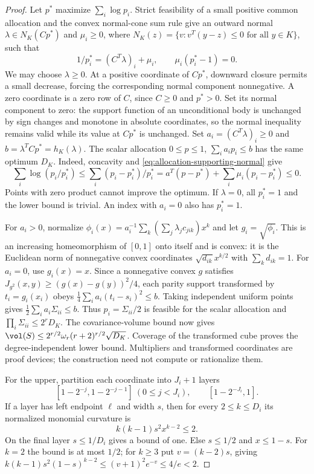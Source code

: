 \begin{proof}
Let $p^*$ maximize $\sum_i\log p_i$. Strict feasibility of a small
positive common allocation and the convex normal-cone sum rule give
an outward normal $\lambda\in N_K(Cp^*)$ and $\mu_i\ge0$, where
$N_K(z)=\{v:v^T(y-z)\le0\text{ for all }y\in K\}$, such that
\begin{equation}\label{eq:allocation-supporting-normal}
 1/p_i^*=(C^T\lambda)_i+\mu_i,\qquad
 \mu_i(p_i^*-1)=0.
\end{equation}
We may choose $\lambda\ge0$. At a positive coordinate of $Cp^*$,
downward closure permits a small decrease, forcing the corresponding
normal component nonnegative. A zero coordinate is a zero row of $C$,
since $C\ge0$ and $p^*>0$. Set its normal component to zero: the
support function of an unconditional body is unchanged by sign changes
and monotone in absolute coordinates, so the normal inequality remains
valid while its value at $Cp^*$ is unchanged.
Set $a_i=(C^T\lambda)_i\ge0$ and
$b=\lambda^TCp^*=h_K(\lambda)$. The scalar allocation
$0\le p\le1$, $\sum_i a_ip_i\le b$ has the same optimum $D_K$.
Indeed, concavity and \eqref{eq:allocation-supporting-normal} give
\[
 \sum_i\log(p_i/p_i^*)
 \le\sum_i(p_i-p_i^*)/p_i^*
 =a^T(p-p^*)+\sum_i\mu_i(p_i-p_i^*)\le0.
\]
Points with zero product cannot improve the optimum. If $\lambda=0$,
all $p_i^*=1$ and the lower bound is trivial. An index with $a_i=0$
also has $p_i^*=1$.

For $a_i>0$, normalize
$\phi_i(x)=a_i^{-1}\sum_k(\sum_j\lambda_jc_{jik})x^k$ and let
$g_i=\sqrt{\phi_i}$. This is an increasing homeomorphism of $[0,1]$
onto itself and is convex: it is the Euclidean norm of nonnegative
convex coordinates $\sqrt{d_{ik}}x^{k/2}$ with $\sum_kd_{ik}=1$.
For $a_i=0$, use $g_i(x)=x$. Since a nonnegative convex $g$ satisfies
$J_{g^2}(x,y)\ge(g(x)-g(y))^2/4$, each parity support transformed
by $t_i=g_i(x_i)$ obeys
$\frac14\sum_i a_i(t_i-s_i)^2\le b$. Taking independent uniform
points gives $\frac12\sum_i a_i\Sigma_{ii}\le b$.
Thus $p_i=\Sigma_{ii}/2$ is feasible for the scalar allocation and
$\prod_i\Sigma_{ii}\le2^rD_K$. The covariance-volume bound now
gives $\vol(S)\le2^{r/2}\omega_r(r+2)^{r/2}\sqrt{D_K}$.
Coverage of the transformed cube proves the degree-independent lower
bound. Multipliers and transformed coordinates are proof devices;
the construction need not compute or rationalize them.

For the upper, partition each coordinate into $J_i+1$ layers
\begin{equation}\label{eq:dyadic-endpoint-layers}
 [1-2^{-j},1-2^{-j-1}]\ (0\le j<J_i),\qquad
 [1-2^{-J_i},1].
\end{equation}
If a layer has left endpoint $\ell$ and width $s$, then for every
$2\le k\le D_i$ its normalized monomial curvature is
\begin{equation}\label{eq:layer-curvature}
 k(k-1)s^2x^{k-2}\le2.
\end{equation}
On the final layer $s\le1/D_i$ gives a bound of one. Else $s\le1/2$
and $x\le1-s$. For $k=2$ the bound is at most $1/2$; for $k\ge3$
put $v=(k-2)s$, giving
$k(k-1)s^2(1-s)^{k-2}\le(v+1)^2e^{-v}\le4/e<2$.


\end{proof}
